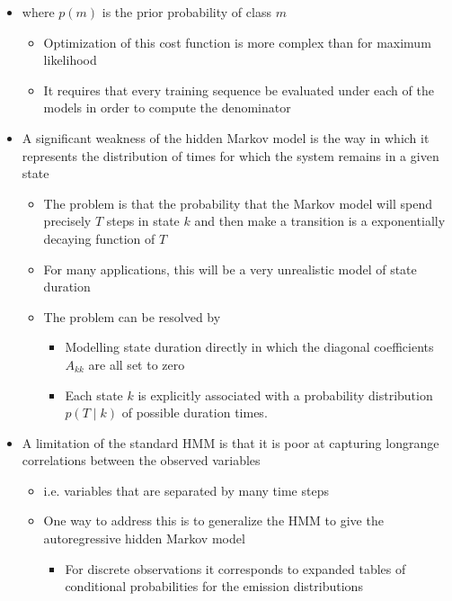 \documentclass[11pt]{article}
\begin{document}
\begin{itemize}
\item where \(p(m)\) is the prior probability of class \(m\)
\begin{itemize}
\item Optimization of this cost function is more complex than for maximum likelihood
\item It requires that every training sequence be evaluated under each of the models in order to compute the denominator
\end{itemize}

\item A significant weakness of the hidden Markov model is the way in which it represents the distribution of times for which the system remains in a given state
\begin{itemize}
\item The problem is that the probability that the Markov model will spend precisely \(T\) steps in state \(k\) and then make a transition is a exponentially decaying function of \(T\)
\item For many applications, this will be a very unrealistic model of state duration
\item The problem can be resolved by
\begin{itemize}
\item Modelling state duration directly in which the diagonal coefficients \(A_{kk}\) are all set to zero
\item Each state \(k\) is explicitly associated with a probability distribution \(p(T \mid k)\) of possible duration times.
\end{itemize}
\end{itemize}

\item A limitation of the standard HMM is that it is poor at capturing longrange correlations between the observed variables
\begin{itemize}
\item i.e. variables that are separated by many time steps
\item One way to address this is to generalize the HMM to give the autoregressive hidden Markov model
\begin{itemize}
\item For discrete observations it corresponds to expanded tables of conditional probabilities for the emission distributions
\end{itemize}
\end{itemize}
\end{itemize}
\end{document}
